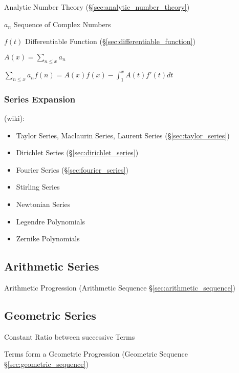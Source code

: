 Analytic Number Theory (\S\ref{sec:analytic_number_theory})

$a_n$ Sequence of Complex Numbers

$f(t)$ Differentiable Function (\S\ref{sec:differentiable_function})

$A(x) = \sum_{n \leq x} a_n$

$\sum_{n \leq x} a_n f(n) = A(x)f(x) - \int_1^x A(t)f'(t) dt$



\subsubsection{Series Expansion}\label{sec:series_expansion}

(wiki):
\begin{itemize}
  \item Taylor Series, Maclaurin Series, Laurent Series
    (\S\ref{sec:taylor_series})
  \item Dirichlet Series (\S\ref{sec:dirichlet_series})
  \item Fourier Series (\S\ref{sec:fourier_series})
  \item Stirling Series
  \item Newtonian Series
  \item Legendre Polynomials
  \item Zernike Polynomials
\end{itemize}



\subsection{Arithmetic Series}\label{sec:arithmetic_series}

Arithmetic Progression (Arithmetic Sequence
\S\ref{sec:arithmetic_sequence})



\subsection{Geometric Series}\label{sec:geometric_series}

Constant Ratio between successive Terms

Terms form a Geometric Progression (Geometric Sequence
\S\ref{sec:geometric_sequence})


